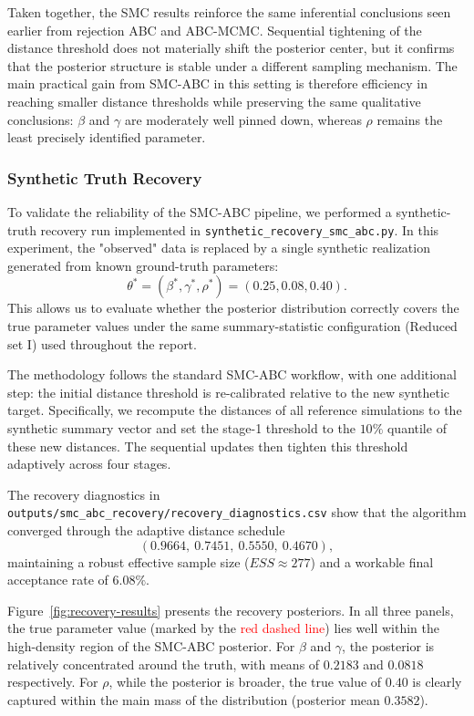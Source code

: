 \documentclass[11pt]{article}
\begin{document}
Taken together, the SMC results reinforce the same inferential conclusions seen earlier from rejection ABC and ABC-MCMC. Sequential tightening of the distance threshold does not materially shift the posterior center, but it confirms that the posterior structure is stable under a different sampling mechanism. The main practical gain from SMC-ABC in this setting is therefore efficiency in reaching smaller distance thresholds while preserving the same qualitative conclusions: $\beta$ and $\gamma$ are moderately well pinned down, whereas $\rho$ remains the least precisely identified parameter.

\subsubsection{Synthetic Truth Recovery}

To validate the reliability of the SMC-ABC pipeline, we performed a synthetic-truth recovery run implemented in \texttt{synthetic\_recovery\_smc\_abc.py}. In this experiment, the "observed" data is replaced by a single synthetic realization generated from known ground-truth parameters:
\[
\theta^* = (\beta^*, \gamma^*, \rho^*) = (0.25, 0.08, 0.40).
\]
This allows us to evaluate whether the posterior distribution correctly covers the true parameter values under the same summary-statistic configuration (Reduced set I) used throughout the report.

The methodology follows the standard SMC-ABC workflow, with one additional step: the initial distance threshold is re-calibrated relative to the new synthetic target. Specifically, we recompute the distances of all reference simulations to the synthetic summary vector and set the stage-1 threshold to the $10\%$ quantile of these new distances. The sequential updates then tighten this threshold adaptively across four stages.

The recovery diagnostics in \texttt{outputs/smc\_abc\_recovery/recovery\_diagnostics.csv} show that the algorithm converged through the adaptive distance schedule
\[
(0.9664,\ 0.7451,\ 0.5550,\ 0.4670),
\]
maintaining a robust effective sample size ($ESS \approx 277$) and a workable final acceptance rate of $6.08\%$.

Figure~\ref{fig:recovery-results} presents the recovery posteriors. In all three panels, the true parameter value (marked by the \textcolor{red}{red dashed line}) lies well within the high-density region of the SMC-ABC posterior.
For $\beta$ and $\gamma$, the posterior is relatively concentrated around the truth, with means of $0.2183$ and $0.0818$ respectively. For $\rho$, while the posterior is broader, the true value of $0.40$ is clearly captured within the main mass of the distribution (posterior mean $0.3582$).
\end{document}

